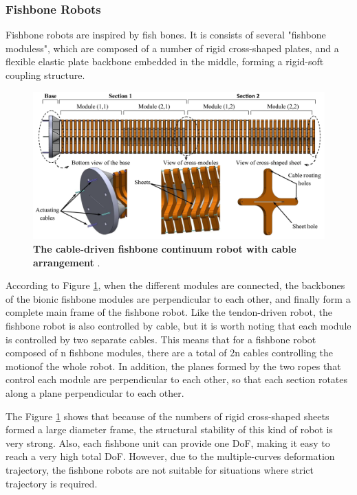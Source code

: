 \subsubsection{Fishbone Robots}
Fishbone robots are inspired by fish bones. It is consists of several "fishbone moduless", which are 
composed of a number of rigid cross-shaped plates, and a flexible elastic plate backbone embedded in the middle, 
forming a rigid-soft coupling structure\cite{fishboneCR}. 
\begin{figure}[H] %
    \centering 
    \captionsetup{labelsep=colon}
    \includegraphics[width=.9\textwidth]{Image/LR/fishbone_CR_amouri2023bio.PNG} 
    \caption[The cable-driven fishbone continuum robot]
    {\centering \textbf{The cable-driven fishbone continuum robot with cable arrangement} \cite{amouri2023bio}.}
    \label{fig:fishboneCR_2023bio}
\end{figure}

According to Figure \ref{fig:fishboneCR_2023bio}, when the different modules are connected, the backbones of the bionic 
fishbone modules are perpendicular to each other, and finally form a complete main frame of the fishbone robot. Like the 
tendon-driven robot, the fishbone robot is also controlled by cable, but it is worth noting that each module is controlled 
by two separate cables. This means that for a fishbone robot composed of n fishbone modules, there are a total of 2n cables 
controlling the motionof the whole robot. In addition, the planes formed by the two ropes that control each module are 
perpendicular to each other, so that each section rotates along a plane perpendicular to each other. 

The Figure \ref{fig:fishboneCR_2023bio} shows that because of the numbers of rigid cross-shaped sheets formed a large diameter 
frame, the structural stability of this kind of robot is very strong. Also, each fishbone unit can provide one DoF, making it 
easy to reach a very high total DoF. However, due to the multiple-curves deformation trajectory, the fishbone robots are not 
suitable for situations where strict trajectory is required\cite{fishboneCR}. 

